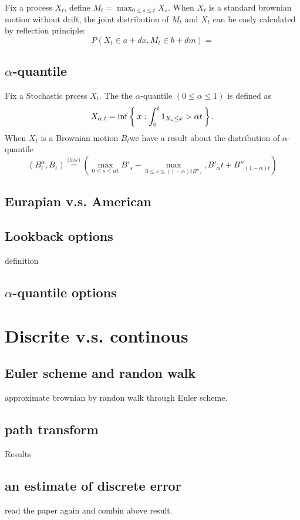 \documentclass[11pt]{book}
\begin{document}
Fix a process $X_t$, define $M_t = \max_{0\leq s\leq t} X_s$. 
When $X_t$ is a standard brownian motion without drift, 
the joint distribution of $M_t$ and $X_t$ can be easly calculated by reflection principle\cite{Karatzas91}:
\[ 
P(X_t \in a+dx, M_t \in b+dm) =  
\]

\subsection{$\alpha$-quantile}
Fix a Stochastic prcess $X_t$.
The the $\alpha$-quantile $( 0 \leq \alpha \leq 1)$ 
is defined as 
\[
X_{\alpha,t} = \inf\Set{x:\int_0^t 1_{X_s\leq x} > \alpha t}.
\]
When $X_{t}$ is a Brownian motion $B_t$we have a result about the distribution
of $\alpha$-quantile\cite{Dassios2005}
\[
(B_t^\alpha, B_t) \stackrel{\text{(law)}}{=}
 (\max_{0\leq s\leq \alpha t} B'_s-\max_{0\leq s\leq (1-\alpha)t B''_s},
 B'_\alpha t + B''_{(1-\alpha) t})
\]




\subsection{Eurapian v.s. American} 


\subsection{Lookback options}
definition

\subsection{$\alpha$-quantile options}

\section{Discrite v.s. continous}
\subsection{Euler scheme and randon walk}
approximate brownian by randon walk through Euler scheme.

\subsection{path transform}
Results\cite{Chaumont1999}

\subsection{an estimate of discrete error}
read the paper again and combin above result. 
\end{document}
